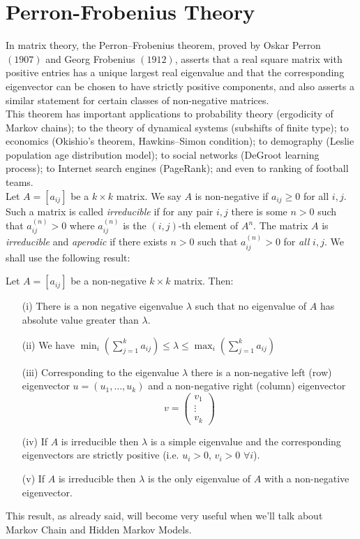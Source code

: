 \section{Perron-Frobenius Theory}
\label{par:perron_frobenius_theory}
In matrix theory, the Perron–Frobenius theorem, proved by Oskar Perron $(1907)$ and Georg Frobenius $(1912)$, asserts that a real square matrix with positive entries has a unique largest real eigenvalue and that the corresponding eigenvector can be chosen to have strictly positive components, and also asserts a similar statement for certain classes of non-negative matrices.
\\This theorem has important applications to probability theory (ergodicity of Markov chains); to the theory of dynamical systems (subshifts of finite type); to economics (Okishio's theorem, Hawkins–Simon condition); to demography (Leslie population age distribution model); to social networks (DeGroot learning process); to Internet search engines (PageRank); and even to ranking of football teams.
\\Let $A=[a_{ij}]$ be a $k \times k$ matrix. We say $A$ is non-negative if $a_{ij} \geq 0$ for all $i,j$. Such a matrix is called \textit{irreducible} if for any pair $i,j$ there is some $n>0$ such that $a_{ij}^{(n)}>0$ where $a_{ij}^{(n)}$ is the $(i,j)$-th element of $A^n$. The matrix $A$ is \textit{irreducible} and \textit{aperodic} if there exists $n>0$ such that $a_{ij}^{(n)} >0$ for \textit{all} $i,j$. We shall use the following result:
\begin{theorem}
    Let $A = [a_{ij}]$ be a non-negative $k \times k$ matrix. Then:
    \begin{itemize}
        \item[(i)] There is a non negative eigenvalue $\lambda$ such that no eigenvalue of $A$ has absolute value greater than $\lambda$.
        \item[(ii)] We have $\min_i( \sum_{j=1}^k a_{ij}) \leq \lambda \leq \max_i( \sum_{j=1}^k a_{ij})$
        \item[(iii)] Corresponding to the eigenvalue $\lambda$ there is a non-negative left (row) eigenvector $u = (u_1, \dots, u_k)$ and a non-negative right (column) eigenvector
        \begin{equation*}
        v = 
            \begin{pmatrix}
                v_1 \\
                \vdots \\
                v_k
            \end{pmatrix}
        \end{equation*}
        \item[(iv)] If $A$ is irreducible then $\lambda$ is a simple eigenvalue and the corresponding eigenvectors are strictly positive (i.e. $u_i >0$, $v_i >0$ $\forall i$).
        \item[(v)] If $A$ is irreducible then $\lambda$ is the only eigenvalue of $A$ with a non-negative eigenvector.
    \end{itemize}
\end{theorem}
This result, as already said, will become very useful when we'll talk about Markov Chain and Hidden Markov Models.

